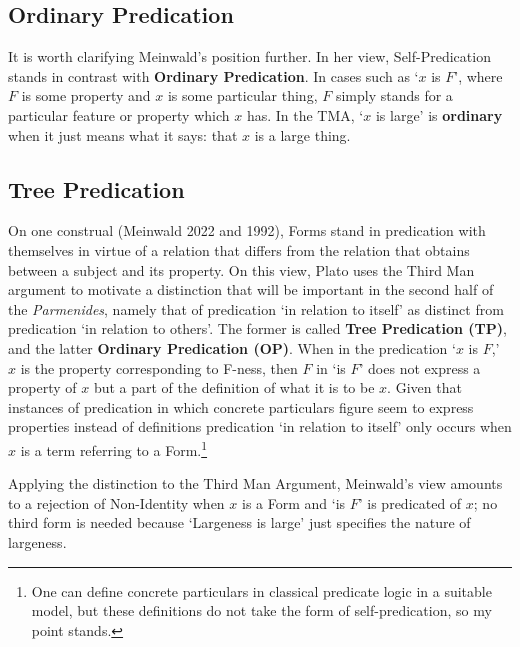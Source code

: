 \subsection{Ordinary Predication}

It is worth clarifying Meinwald's position further. In her view, Self-Predication stands in contrast with \textbf{Ordinary Predication}. In cases such as `$x$ is $F$', where $F$ is some property and $x$ is some particular thing, $F$ simply stands for a particular feature or property which $x$ has. In the TMA, `$x$ is large' is \textbf{ordinary} when it just means what it says: that $x$ is a large thing.

\subsection{Tree Predication}

On one construal (Meinwald 2022 and 1992), Forms stand in predication with themselves in virtue of a relation that differs from the relation that obtains between a subject and its property. On this view, Plato uses the Third Man argument to motivate a distinction that will be important in the second half of the \textit{Parmenides}, namely that of predication `in relation to itself’ as distinct from predication `in relation to others’. The former is called \textbf{Tree Predication (TP)}, and the latter \textbf{Ordinary Predication (OP)}.  When in the predication `$x$ is $F$,’ $x$ is the property corresponding to F-ness, then $F$ in `is $F$' does not express a property of $x$ but a part of the definition of what it is to be $x$. Given that instances of predication in which concrete particulars figure seem to express properties instead of definitions predication `in relation to itself’ only occurs when $x$ is a term referring to a Form.\footnote{One can define concrete particulars in classical predicate logic in a suitable model, but these definitions do not take the form of self-predication, so my point stands.}

Applying the distinction to the Third Man Argument, Meinwald’s view amounts to a rejection of Non-Identity when $x$ is a Form and `is $F$' is predicated of $x$; no third form is needed because `Largeness is large' just specifies the nature of largeness. 

